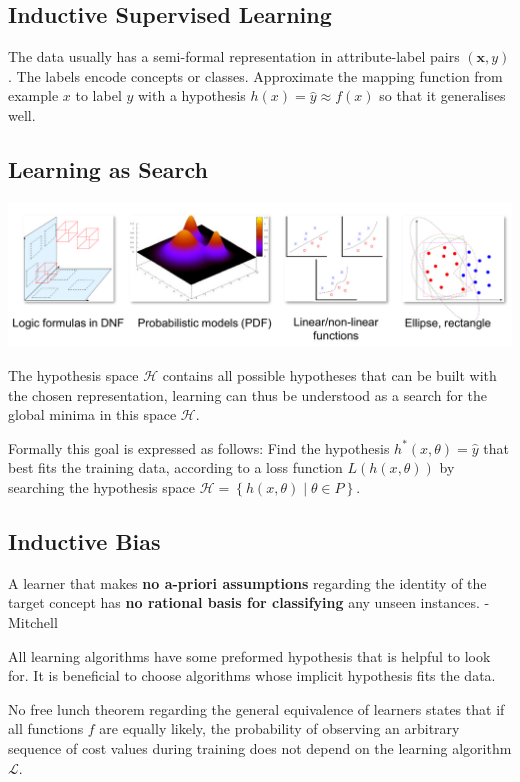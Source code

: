 \documentclass[11pt]{article}
\theoremstyle{definition}
\begin{document}
\subsection{Inductive Supervised Learning}
The data usually has a semi-formal representation in attribute-label pairs $(\textbf{x}, y)$. The labels encode concepts or classes.
Approximate the mapping function from example $x$ to label $y$ with a hypothesis $h(x) = \hat{y} \approx f(x)$ so that it generalises well.

\subsection{Learning as Search}
\begin{center}
	\includegraphics[width=0.7\linewidth]{img/hypothesis_space}
\end{center}

The hypothesis space $\mathcal{H}$ contains all possible hypotheses that can be built with the chosen representation, learning can thus be understood as a search for the global minima in this space $\mathcal{H}$.

\noindent
Formally this goal is expressed as follows: Find the hypothesis $h^* (x,\theta) = \hat{y}$ that best fits the training data, according to a loss function $L(h(x,\theta))$ by searching the hypothesis space $\mathcal{H} = \left\{ h(x,\theta) \middle| \theta \in P\right\}$.

\subsection{Inductive Bias}
\begin{theorem}
	A learner that makes \textbf{no a-priori assumptions} regarding the identity of the target concept has \textbf{no rational basis for classifying} any unseen instances. - Mitchell
\end{theorem}
All learning algorithms have some preformed hypothesis that is helpful to look for. It is beneficial to choose algorithms whose implicit hypothesis fits the data.

No free lunch theorem regarding the general equivalence of learners states that if all functions $f$ are equally likely, the probability of observing an arbitrary sequence of cost values during training does not depend on the learning algorithm $\mathcal{L}$.
\end{document}

